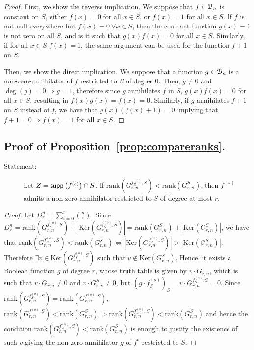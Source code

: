 \documentclass[11pt]{llncs}
\begin{document}
\begin{proof}
	First, we show the reverse implication.
	We suppose that $f\in \mathcal{B}_n$ is constant on $S$, either $f(x) = 0$ for all $x\in S$, or $f(x) = 1$ for all $x\in S$.
	If $f$ is not null everywhere but $f(x) = 0\ \forall x \in  S$, then the constant function $g(x) = 1$ is not zero on all $S$, and is it such that $g(x)f(x) = 0$ for all $x\in S$. 
	Similarly, if for all $x\in S$ $f(x) = 1$, the same argument can be used for the function $f+ 1$ on $S$.
	
	Then, we show the direct implication.
	We suppose that a function $g\in \mathcal{B}_n$ is a non-zero-annihilator of $f$ restricted to $S$ of degree $0$. Then,
	$g \neq 0$ and $\deg(g) = 0 \Rightarrow g = 1$, therefore since $g$ annihilates $f$ in $S$,  $g(x) f(x) = 0$ for all $x \in S$, resulting in $f(x)g(x) = f(x) = 0$.
	Similarly, if $g$ annihilates $f+ 1$ on $S$ instead of $f$, we have that $g(x)(f(x) + 1) = 0$ implying that $f+ 1 = 0 \Rightarrow f(x) = 1$ for all $x\in S$. 
\end{proof}

\subsection{Proof of Proposition~\ref{prop:compareranks}.}
\begin{description}
    \item[Statement:] Let $Z = \mathsf{supp}\left(f^{(o)}\right) \cap S$.
If $\text{rank}\left(G^{f_{Z}^{(o)},S}_{r,n}\right) < \text{rank}(G^{S}_{r,n})$, then $f^{(o)}$ admits a non-zero-annihilator restricted to $S$ of degree at most $r$.
\end{description}

\begin{proof}
	Let $D_r^n = \sum_{i=0}^r \binom{n}{i}$. Since $D_r^n = \text{rank}(G^{f^{(o)}_S,S}_{r,n}) + |\text{Ker}(G^{f^{(o)}_S,S}_{r,n})| =  \text{rank}(G^{S}_{r,n}) + |\text{Ker}(G^{S}_{r,n})|$, we have that
	$\text{rank}(G^{f_S^{(o)},S}_{r,n}) < \text{rank}(G^{S}_{r,n}) \iff |\text{Ker}(G^{f_S^{(o)},S}_{r,n})| > |\text{Ker}(G^{S}_{r,n})|$. 
	Therefore $\exists v\in \text{Ker}(G^{f_S^{(o)},S}_{r,n}) \mbox{ such that }v\not\in \text{Ker}(G^{S}_{r,n})$. 
	Hence, it exists a Boolean function $g$ of degree $r$, whose truth table is given by $v \cdot G_{r,n}$, which is such that $v \cdot G_{r,n}\neq 0$ and $v \cdot G_{r,n}^{S}\neq 0$, but $(g \cdot f_S^{(o)})_S = v \cdot G_{r,n}^{f_S^{(o)},S} = 0$.
	Since $\text{rank}\left(G_{r,n}^{f_S^{(o)}, S}\right) = \text{rank}\left(G_{r,n}^{f^{(o)}, S}\right)$, $\text{rank}(G^{f^{(o)},S}_{r,n}) < \text{rank}(G^{S}_{r,n}) \Rightarrow \text{rank}(G^{f_Z^{(o)},S}_{r,n}) < \text{rank}(G^{S}_{r,n})$ and hence the condition $\text{rank}(G^{f_Z^{(o)},S}_{r,n}) < \text{rank}(G^{S}_{r,n})$ is enough to justify the existence of such $v$ giving the non-zero-annihilator $g$ of $f^{o}$ restricted to $S$.
\end{proof}
\end{document}
